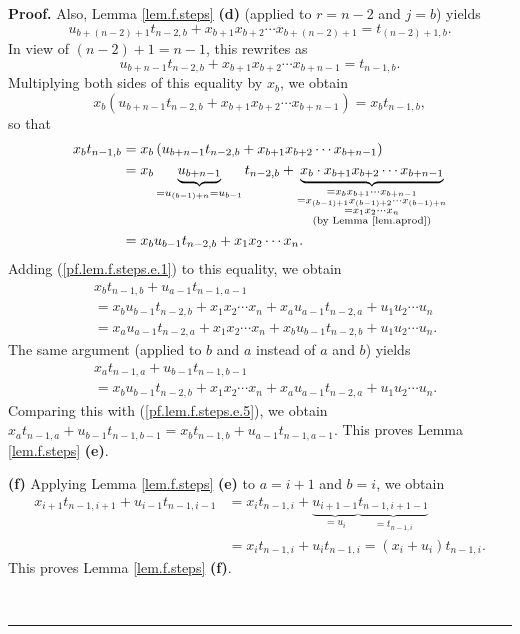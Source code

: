 \documentclass[numbers=enddot,12pt,final,onecolumn,notitlepage]{scrartcl}%
\theoremstyle{definition}
\newenvironment{proof}[1][Proof]{\noindent\textbf{#1.} }{\ \rule{0.5em}{0.5em}}
\begin{document}
\begin{proof}
Also, Lemma \ref{lem.f.steps} \textbf{(d)} (applied to $r=n-2$ and $j=b$)
yields%
\[
u_{b+\left(  n-2\right)  +1}t_{n-2,b}+x_{b+1}x_{b+2}\cdots x_{b+\left(
n-2\right)  +1}=t_{\left(  n-2\right)  +1,b}.
\]
In view of $\left(  n-2\right)  +1=n-1$, this rewrites as%
\[
u_{b+n-1}t_{n-2,b}+x_{b+1}x_{b+2}\cdots x_{b+n-1}=t_{n-1,b}.
\]
Multiplying both sides of this equality by $x_{b}$, we obtain%
\[
x_{b}\left(  u_{b+n-1}t_{n-2,b}+x_{b+1}x_{b+2}\cdots x_{b+n-1}\right)
=x_{b}t_{n-1,b},
\]
so that%
\begin{align*}
x_{b}t_{n-1,b}  &  =x_{b}\left(  u_{b+n-1}t_{n-2,b}+x_{b+1}x_{b+2}\cdots
x_{b+n-1}\right) \\
&  =x_{b}\underbrace{u_{b+n-1}}_{=u_{\left(  b-1\right)  +n}=u_{b-1}}%
t_{n-2,b}+\underbrace{x_{b}\cdot x_{b+1}x_{b+2}\cdots x_{b+n-1}}%
_{\substack{=x_{b}x_{b+1}\cdots x_{b+n-1}\\=x_{\left(  b-1\right)
+1}x_{\left(  b-1\right)  +2}\cdots x_{\left(  b-1\right)  +n}\\=x_{1}%
x_{2}\cdots x_{n}\\\text{(by Lemma \ref{lem.aprod})}}}\\
&  =x_{b}u_{b-1}t_{n-2,b}+x_{1}x_{2}\cdots x_{n}.
\end{align*}
Adding (\ref{pf.lem.f.steps.e.1}) to this equality, we obtain%
\begin{align}
&  x_{b}t_{n-1,b}+u_{a-1}t_{n-1,a-1}\nonumber\\
&  =x_{b}u_{b-1}t_{n-2,b}+x_{1}x_{2}\cdots x_{n}+x_{a}u_{a-1}t_{n-2,a}%
+u_{1}u_{2}\cdots u_{n}\label{pf.lem.f.steps.e.5}\\
&  =x_{a}u_{a-1}t_{n-2,a}+x_{1}x_{2}\cdots x_{n}+x_{b}u_{b-1}t_{n-2,b}%
+u_{1}u_{2}\cdots u_{n}.\nonumber
\end{align}
The same argument (applied to $b$ and $a$ instead of $a$ and $b$) yields%
\begin{align*}
&  x_{a}t_{n-1,a}+u_{b-1}t_{n-1,b-1}\\
&  =x_{b}u_{b-1}t_{n-2,b}+x_{1}x_{2}\cdots x_{n}+x_{a}u_{a-1}t_{n-2,a}%
+u_{1}u_{2}\cdots u_{n}.
\end{align*}
Comparing this with (\ref{pf.lem.f.steps.e.5}), we obtain $x_{a}%
t_{n-1,a}+u_{b-1}t_{n-1,b-1}=x_{b}t_{n-1,b}+u_{a-1}t_{n-1,a-1}$. This proves
Lemma \ref{lem.f.steps} \textbf{(e)}.

\textbf{(f)} Applying Lemma \ref{lem.f.steps} \textbf{(e)} to $a=i+1$ and
$b=i$, we obtain%
\begin{align*}
x_{i+1}t_{n-1,i+1}+u_{i-1}t_{n-1,i-1}  &  =x_{i}t_{n-1,i}%
+\underbrace{u_{i+1-1}}_{=u_{i}}\underbrace{t_{n-1,i+1-1}}_{=t_{n-1,i}}\\
&  =x_{i}t_{n-1,i}+u_{i}t_{n-1,i}=\left(  x_{i}+u_{i}\right)  t_{n-1,i}.
\end{align*}
This proves Lemma \ref{lem.f.steps} \textbf{(f)}.


\end{proof}
\end{document}
